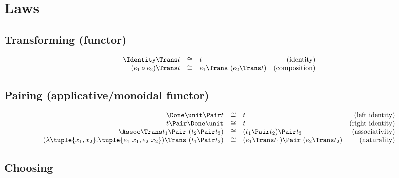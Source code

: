 
\section{Laws}

\subsection{Transforming (functor)}

\begin{equation*}
  \begin{array}{rclr}
    \Identity \Trans t
      &\cong& t
      & \text{(identity)} \\
    (e_1 \circ e_2) \Trans t
      &\cong& e_1 \Trans\ (e_2 \Trans t)
      & \text{(composition)} \\
  \end{array}
\end{equation*}


\subsection{Pairing (applicative/monoidal functor)}

\begin{equation*}
  \begin{array}{rclr}
    \Done \unit \Pair t
      &\cong& t
      & \text{(left identity)} \\
    t \Pair \Done \unit
      &\cong& t
      & \text{(right identity)} \\
    \Assoc \Trans t_1 \Pair\ (t_2 \Pair t_3)
      &\cong& (t_1 \Pair t_2) \Pair t_3
      & \text{(associativity)} \\
    (\lambda \tuple{x_1, x_2}. \tuple{e_1\ x_1, e_2\ x_2}) \Trans\ (t_1 \Pair t_2)
      &\cong& (e_1 \Trans t_1) \Pair\ (e_2 \Trans t_2)
      & \text{(naturality)} \\
  \end{array}
\end{equation*}


\subsection{Choosing}

